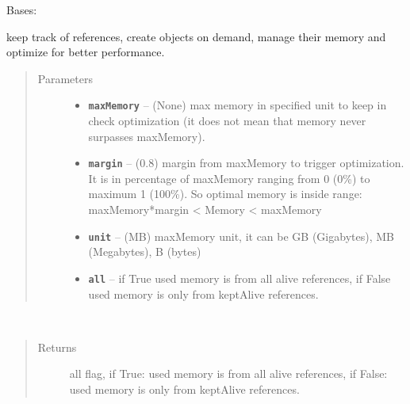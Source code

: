\documentclass[letterpaper,10pt,english]{sphinxmanual}
\begin{document}
\begin{fulllineitems}
\label{RRtoolbox.lib:RRtoolbox.lib.cache.ResourceManager}
Bases: {\hyperref[RRtoolbox.lib:RRtoolbox.lib.cache.Retriever]{\emph{}}}

keep track of references, create objects on demand, manage their memory and optimize for better performance.
\begin{quote}\begin{description}
\item[{Parameters}] \leavevmode\begin{itemize}
\item {} 
\textbf{\texttt{maxMemory}} -- (None) max memory in specified unit to keep in check optimization (it does
not mean that memory never surpasses maxMemory).

\item {} 
\textbf{\texttt{margin}} -- (0.8) margin from maxMemory to trigger optimization.
It is in percentage of maxMemory ranging from 0 (0\%) to maximum 1 (100\%).
So optimal memory is inside range: maxMemory*margin \textless{} Memory \textless{} maxMemory

\item {} 
\textbf{\texttt{unit}} -- (MB) maxMemory unit, it can be GB (Gigabytes), MB (Megabytes), B (bytes)

\item {} 
\textbf{\texttt{all}} -- if True used memory is from all alive references,
if False used memory is only from keptAlive references.

\end{itemize}

\end{description}\end{quote}

\begin{fulllineitems}
\label{RRtoolbox.lib:RRtoolbox.lib.cache.ResourceManager.all}~\begin{quote}\begin{description}
\item[{Returns}] \leavevmode
all flag, if True: used memory is from all alive references,
if False: used memory is only from keptAlive references.


\end{description}
\end{quote}
\end{fulllineitems}
\end{fulllineitems}
\end{document}
